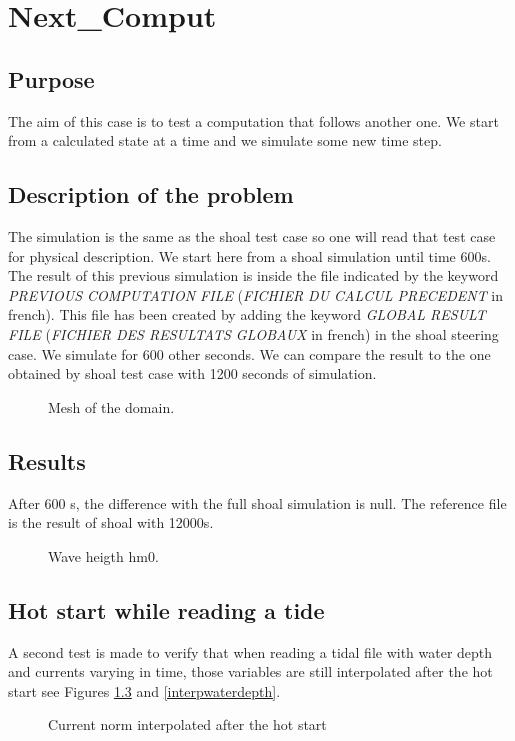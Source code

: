 \chapter{Next\_Comput}

\section{Purpose}
%
The aim of this case is to test a computation that follows another one. We
start from a calculated state at a time and we simulate some new time step.
%
\section{Description of the problem}
%
The simulation is the same as the shoal test case so one will read that test
case for physical description. We start here from a shoal simulation until time
600s. The result of this previous simulation is inside the file indicated by
the keyword {\it PREVIOUS COMPUTATION FILE} ({\it FICHIER DU CALCUL PRECEDENT}
in french). This file has been created by adding the keyword  {\it GLOBAL
  RESULT FILE} ({\it FICHIER DES RESULTATS GLOBAUX} in french) in the shoal
steering case.
We simulate for 600 other seconds. We can compare the result to the one
obtained by shoal test case with 1200 seconds of simulation.
\begin{figure} [!h]
\centering
{}
 \caption{Mesh of the domain.}
\label{meshnextcomp}
\end{figure}

\section{Results}
After 600 s, the difference with the full shoal simulation is null. The
reference file is the result of shoal with 12000s.
\begin{figure} [!h]
\centering
{}
 \caption{Wave heigth hm0.}
\label{resnextcomp}
\end{figure}

\section{Hot start while reading a tide}
A second test is made to verify that when reading a tidal file with
water depth and currents varying in time, those variables are still
interpolated after the hot start see Figures \ref{interpcurrent} and
\ref{interpwaterdepth}.
\begin{figure} [!h]
\centering
{}
 \caption{Current norm interpolated after the hot start}
\label{interpcurrent}
\end{figure}


